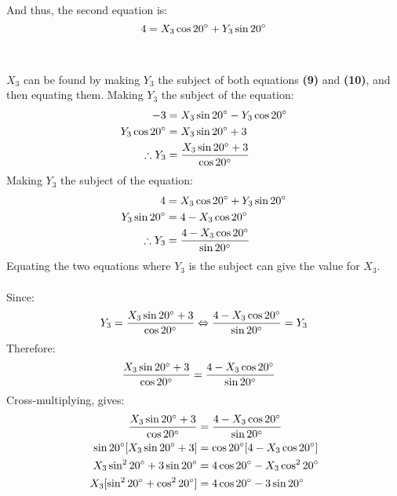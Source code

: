 \documentclass{article}
\begin{document}
            And thus, the second equation is:
            \begin{equation}
                4 = X_3\cos{20\degree} + Y_3\sin{20\degree}
            \end{equation}
            \\\\
            $X_3$ can be found by making $Y_3$ the subject of both equations \textbf{(9)} and \textbf{(10)}, and then equating them.
            Making $Y_3$ the subject of the equation:
            \begin{align*}
                -3 &= X_3\sin{20\degree} - Y_3\cos{20\degree} \\
                Y_3\cos{20\degree} &= X_3\sin{20\degree} + 3 \\
                \therefore Y_3 &= \frac{X_3\sin{20\degree} + 3}{\cos{20\degree}}
            \end{align*}
            Making $Y_3$ the subject of the equation:
            \begin{align*}
                4 &= X_3\cos{20\degree} + Y_3\sin{20\degree} \\
                Y_3\sin{20\degree} &= 4 - X_3\cos{20\degree} \\
                \therefore Y_3 &= \frac{4 - X_3\cos{20\degree}}{\sin{20\degree}}
            \end{align*}
            Equating the two equations where $Y_3$ is the subject can give the value for $X_3$. \\\\ 
            Since:
            \begin{equation*}
                Y_3 = \frac{X_3\sin{20\degree} + 3}{\cos{20\degree}} \Leftrightarrow \frac{4 - X_3\cos{20\degree}}{\sin{20\degree}} = Y_3
            \end{equation*}
            Therefore:
            \begin{align*}
                \frac{X_3\sin{20\degree} + 3}{\cos{20\degree}} &= \frac{4 - X_3\cos{20\degree}}{\sin{20\degree}}
            \end{align*}
            Cross-multiplying, gives:
            \begin{align*}
            \frac{X_3\sin{20\degree} + 3}{\cos{20\degree}} &= \frac{4 - X_3\cos{20\degree}}{\sin{20\degree}} \\
            \sin{20\degree}[X_3\sin{20\degree} + 3] &= \cos{20\degree}[4 - X_3\cos{20\degree}] \\
            X_3\sin^2{20\degree} + 3\sin{20\degree} &= 4\cos{20\degree} - X_3\cos^2{20\degree} \\
            X_3[\sin^2{20\degree} + \cos^2{20\degree}] &= 4\cos{20\degree} - 3\sin{20\degree}
            \end{align*}
\end{document}
